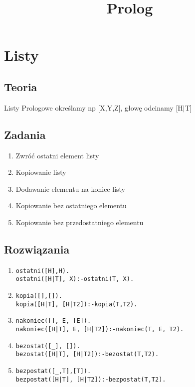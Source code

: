 \documentclass[10pt,a4paper]{article}
\title{Prolog}
\author{}
\date{}
\begin{document}
\maketitle
\section{Listy}
\subsection{Teoria}
Listy Prologowe określamy np [X,Y,Z], głowę odcinamy [H$|$T]
\subsection{Zadania}
\begin{enumerate}
\item Zwróć ostatni element listy
\item Kopiowanie listy
\item Dodawanie elementu na koniec listy
\item Kopiowanie bez ostatniego elementu
\item Kopiowanie bez przedostatniego elementu
\end{enumerate}
\subsection{Rozwiązania}
\begin{enumerate}
\item
\begin{verbatim}
ostatni([H],H).
ostatni([H|T], X):-ostatni(T, X).
\end{verbatim}
\item
\begin{verbatim}
kopia([],[]).
kopia([H|T], [H|T2]):-kopia(T,T2).
\end{verbatim}
\item
\begin{verbatim}
nakoniec([], E, [E]).
nakoniec([H|T], E, [H|T2]):-nakoniec(T, E, T2).
\end{verbatim}
\item
\begin{verbatim}
bezostat([_], []).
bezostat([H|T], [H|T2]):-bezostat(T,T2).
\end{verbatim}
\item
\begin{verbatim}
bezpostat([_,T],[T]).
bezpostat([H|T], [H|T2]):-bezpostat(T,T2).
\end{verbatim}
\end{enumerate}
\end{document}
